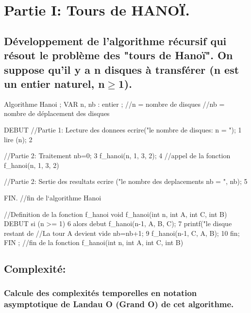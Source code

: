 \documentclass[12pt]{article}
\begin{document}
\def\reportnumber{5}
\def\reporttitle{Algorithmes de complexité temporelle linéaire O($a^{n}$) (a$\rangle$1)}


\section{Partie I: Tours de HANOÏ.}

\subsection{Développement de l'algorithme récursif qui résout le problème des "tours de Hanoï". On suppose qu'il y a n disques à transférer (n est un entier naturel, n$\ge$1).}

\begin{sql}

Algorithme Hanoi ;
VAR n, nb : entier ;		
	//n = nombre de disques
  	//nb = nombre de déplacement des disques
  	
DEBUT
    //Partie 1: Lecture des donnees
ecrire("\nDonner le nombre de disques: n = ");			1
lire (n);												2

    //Partie 2: Traitement
nb=0;													3
f_hanoi(n, 1, 3, 2);									4
//appel de la fonction f_hanoi(n, 1, 3, 2)
  
    //Partie 2: Sertie des resultats
ecrire ("le nombre des deplacements nb = ", nb);		5
 
FIN. 
//fin de l`algorithme  Hanoi


//Definition de la fonction f_hanoi
void f_hanoi(int n, int A, int C, int B)
DEBUT 
si (n >= 1)												6 
   	alors debut
	   	f_hanoi(n-1, A, B, C);							7
        printf(" le disque restant de %
//La tour A devient vide
        nb=nb+1;										9
       f_hanoi(n-1, C, A, B);							10
	fin;
FIN ; 
//fin de la fonction f_hanoi(int n, int A, int C, int B)

 
\end{sql}

\subsection{Complexité:}

\subsubsection{Calcule des complexités temporelles en notation asymptotique de Landau O (Grand O) de  cet  algorithme. }
\end{document}
